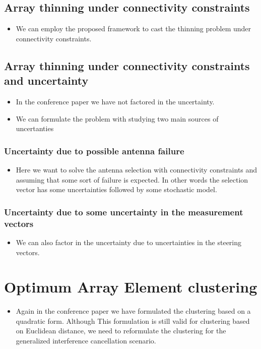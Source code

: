 \documentclass[journal]{IEEEtran}
\begin{document}
\subsection{Array thinning under connectivity constraints} 
\begin{itemize}
    \item  We can employ the proposed framework to cast the thinning problem under connectivity constraints. 
\end{itemize}
\subsection{Array thinning under connectivity constraints and uncertainty} 
\begin{itemize}
    \item  In the conference paper we have not factored in the uncertainty.
    \item We can formulate the problem with studying two main sources of uncertanties
\end{itemize}
\subsubsection{Uncertainty due to possible antenna failure} 
\begin{itemize}
\item Here we want to solve the antenna selection with connectivity constraints and assuming that some sort of failure is expected. In other words the selection vector has some uncertainties followed by some stochastic model.  
\end{itemize}
\subsubsection{Uncertainty due to some uncertainty in the measurement vectors} 
\begin{itemize}
\item We can also factor in the uncertainty due to uncertainties in the steering vectors.
\end{itemize}
\section{Optimum Array Element clustering}\label{sec:Opt_clustering}
\begin{itemize}
\item Again in the conference paper we have formulated the clustering based on a quadratic form. Although This formulation is still valid for clustering based on Euclidean distance, we need to reformulate the clustering for the generalized interference cancellation scenario.
\end{itemize}
\end{document}
